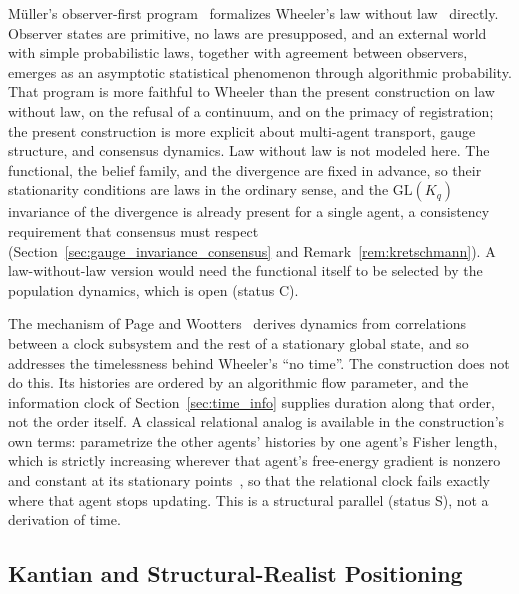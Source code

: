 \documentclass[11pt]{article}
\begin{document}
M{\"u}ller's observer-first program~\cite{Mueller2020} formalizes Wheeler's law without law~\cite{Wheeler1983} directly. Observer states are primitive, no laws are presupposed, and an external world with simple probabilistic laws, together with agreement between observers, emerges as an asymptotic statistical phenomenon through algorithmic probability. That program is more faithful to Wheeler than the present construction on law without law, on the refusal of a continuum, and on the primacy of registration; the present construction is more explicit about multi-agent transport, gauge structure, and consensus dynamics. Law without law is not modeled here. The functional, the belief family, and the divergence are fixed in advance, so their stationarity conditions are laws in the ordinary sense, and the $\mathrm{GL}(K_q)$ invariance of the divergence is already present for a single agent, a consistency requirement that consensus must respect (Section~\ref{sec:gauge_invariance_consensus} and Remark~\ref{rem:kretschmann}). A law-without-law version would need the functional itself to be selected by the population dynamics, which is open (status C).

The mechanism of Page and Wootters~\cite{PageWootters1983} derives dynamics from correlations between a clock subsystem and the rest of a stationary global state, and so addresses the timelessness behind Wheeler's ``no time''. The construction does not do this. Its histories are ordered by an algorithmic flow parameter, and the information clock of Section~\ref{sec:time_info} supplies duration along that order, not the order itself. A classical relational analog is available in the construction's own terms: parametrize the other agents' histories by one agent's Fisher length, which is strictly increasing wherever that agent's free-energy gradient is nonzero and constant at its stationary points~\cite[Ch.~7]{DennisGaugeVFE2026}, so that the relational clock fails exactly where that agent stops updating. This is a structural parallel (status S), not a derivation of time.

\subsection{Kantian and Structural-Realist Positioning}
\end{document}
